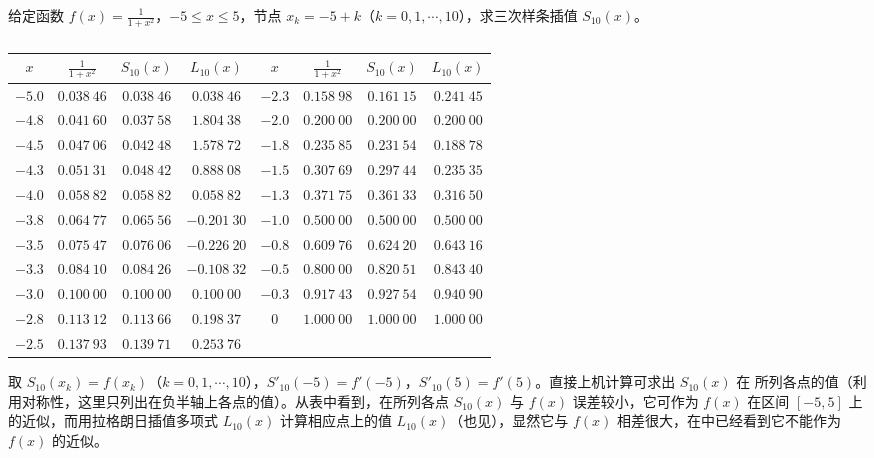 \documentclass[../../main.tex]{subfiles}
\begin{document}
\begin{example}
给定函数 $f(x)=\frac{1}{1+x^2}$，$-5\leqslant x\leqslant 5$，节点 $x_k=-5+k$（$k=0,1,\cdots,10$），求三次样条插值 $S_{10}(x)$。
\end{example}
\begin{solution}
\begin{table}[H]
\centering
\caption{}
\label{table:数值分析例题表格2-7}
\begin{tabular}{c c c c || c c c c}
\hline
$x$ & $\frac{1}{1+x^2}$ & $S_{10}(x)$ & $L_{10}(x)$ & $x$ & $\frac{1}{1+x^2}$ & $S_{10}(x)$ & $L_{10}(x)$ \\
\hline
$-5.0$ & $0.038\ 46$ & $0.038\ 46$ & $0.038\ 46$ & $-2.3$ & $0.158\ 98$ & $0.161\ 15$ & $0.241\ 45$ \\
$-4.8$ & $0.041\ 60$ & $0.037\ 58$ & $1.804\ 38$ & $-2.0$ & $0.200\ 00$ & $0.200\ 00$ & $0.200\ 00$ \\
$-4.5$ & $0.047\ 06$ & $0.042\ 48$ & $1.578\ 72$ & $-1.8$ & $0.235\ 85$ & $0.231\ 54$ & $0.188\ 78$ \\
$-4.3$ & $0.051\ 31$ & $0.048\ 42$ & $0.888\ 08$ & $-1.5$ & $0.307\ 69$ & $0.297\ 44$ & $0.235\ 35$ \\
$-4.0$ & $0.058\ 82$ & $0.058\ 82$ & $0.058\ 82$ & $-1.3$ & $0.371\ 75$ & $0.361\ 33$ & $0.316\ 50$ \\
$-3.8$ & $0.064\ 77$ & $0.065\ 56$ & $-0.201\ 30$ & $-1.0$ & $0.500\ 00$ & $0.500\ 00$ & $0.500\ 00$ \\
$-3.5$ & $0.075\ 47$ & $0.076\ 06$ & $-0.226\ 20$ & $-0.8$ & $0.609\ 76$ & $0.624\ 20$ & $0.643\ 16$ \\
$-3.3$ & $0.084\ 10$ & $0.084\ 26$ & $-0.108\ 32$ & $-0.5$ & $0.800\ 00$ & $0.820\ 51$ & $0.843\ 40$ \\
$-3.0$ & $0.100\ 00$ & $0.100\ 00$ & $0.100\ 00$ & $-0.3$ & $0.917\ 43$ & $0.927\ 54$ & $0.940\ 90$ \\
$-2.8$ & $0.113\ 12$ & $0.113\ 66$ & $0.198\ 37$ & $0$ & $1.000\ 00$ & $1.000\ 00$ & $1.000\ 00$ \\
$-2.5$ & $0.137\ 93$ & $0.139\ 71$ & $0.253\ 76$ &  &  &  &  \\
\hline
\end{tabular}
\end{table}
取 $S_{10}(x_k)=f(x_k)$（$k=0,1,\cdots,10$），$S'_{10}(-5)=f'(-5)$，$S'_{10}(5)=f'(5)$。直接上机计算可求出 $S_{10}(x)$ 在 所列各点的值（利用对称性，这里只列出在负半轴上各点的值）。从表中看到，在所列各点 $S_{10}(x)$ 与 $f(x)$ 误差较小，它可作为 $f(x)$ 在区间 $[-5,5]$ 上的近似，而用拉格朗日插值多项式 $L_{10}(x)$ 计算相应点上的值 $L_{10}(x)$（也见），显然它与 $f(x)$ 相差很大，在中已经看到它不能作为 $f(x)$ 的近似。

\end{solution}
\end{document}
